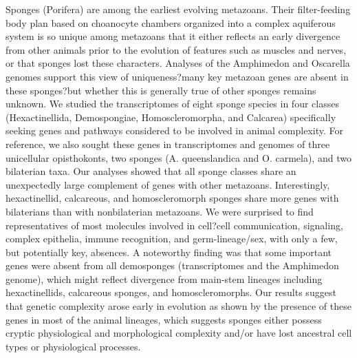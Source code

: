 \documentclass{article}
\begin{document}
Sponges (Porifera) are among the earliest evolving metazoans. Their filter-feeding body plan based on choanocyte chambers organized into a complex aquiferous system is so unique among metazoans that it either reflects an early divergence from other animals prior to the evolution of features such as muscles and nerves, or that sponges lost these characters. Analyses of the Amphimedon and Oscarella genomes support this view of uniqueness?many key metazoan genes are absent in these sponges?but whether this is generally true of other sponges remains unknown. We studied the transcriptomes of eight sponge species in four classes (Hexactinellida, Demospongiae, Homoscleromorpha, and Calcarea) specifically seeking genes and pathways considered to be involved in animal complexity. For reference, we also sought these genes in transcriptomes and genomes of three unicellular opisthokonts, two sponges (A. queenslandica and O. carmela), and two bilaterian taxa. Our analyses showed that all sponge classes share an unexpectedly large complement of genes with other metazoans. Interestingly, hexactinellid, calcareous, and homoscleromorph sponges share more genes with bilaterians than with nonbilaterian metazoans. We were surprised to find representatives of most molecules involved in cell?cell communication, signaling, complex epithelia, immune recognition, and germ-lineage/sex, with only a few, but potentially key, absences. A noteworthy finding was that some important genes were absent from all demosponges (transcriptomes and the Amphimedon genome), which might reflect divergence from main-stem lineages including hexactinellids, calcareous sponges, and homoscleromorphs. Our results suggest that genetic complexity arose early in evolution as shown by the presence of these genes in most of the animal lineages, which suggests sponges either possess cryptic physiological and morphological complexity and/or have lost ancestral cell types or physiological processes.
\end{document}
